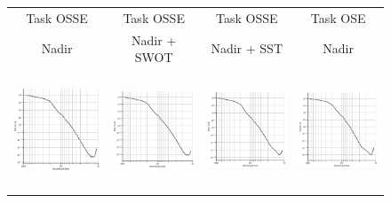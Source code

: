 \begin{figure}[t!]
\small
\begin{center}
\setlength{\tabcolsep}{1pt}
\begin{tabular}{cccc}
\hspace{3mm} Task OSSE & 
 Task OSSE & 
\hspace{-10mm} Task OSSE & 
\hspace{-10mm}Task OSE \\
\hspace{3mm}  Nadir & 
 Nadir + SWOT & 
\hspace{-10mm} Nadir + SST & 
\hspace{-10mm}Nadir \\
\includegraphics[trim={0 0 0 0},clip, width=3.70cm,height=3.5cm]{00_Oceanbench/content/figures/fourdvarnet_figs/osse_gf_nadir_isotrop.png} &
\includegraphics[trim={18mm 0 0 0},clip, width=3.3cm,height=3.5cm]{00_Oceanbench/content/figures/fourdvarnet_figs/osse_gf_nadirswot_isotrop.png} &
\hspace{-5mm}\includegraphics[trim={18mm 0 0 0},clip, width=3.3cm,height=3.5cm]{00_Oceanbench/content/figures/fourdvarnet_figs/osse_gf_nadir_sst_isotrop.png} &
\hspace{-10mm}\includegraphics[trim={18mm 0 0 0},clip,width=3.3cm,height=3.5cm]{00_Oceanbench/content/figures/fourdvarnet_figs/ose_gf_isotrop.png} \\

\end{tabular}
\end{center}
\end{figure}
